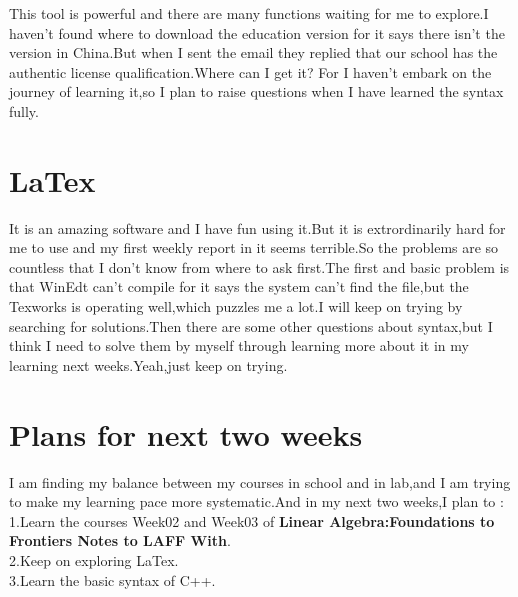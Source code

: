 \documentclass{article}
\begin{document}
This tool is powerful and there are many functions waiting for me to explore.I haven't found where to download the education version for it says there isn't the version in China.But when I sent the email they replied that our school has the authentic license qualification.Where can I get it? For I haven't embark on the journey of learning it,so I plan to raise questions when I have learned the syntax fully.

\section{LaTex}

It is an amazing software and I have fun using it.But it is extrordinarily hard for me to use and my first weekly report in it seems terrible.So the problems are so countless that I don't know from where to ask first.The first and basic problem is that WinEdt can't compile for it says the system can't find the file,but the Texworks is operating well,which puzzles me a lot.I will keep on trying by searching for solutions.Then there are some other questions about syntax,but I think I need to solve them by myself through learning more about it in my learning next weeks.Yeah,just keep on trying.

\section{Plans for next two weeks}
I am finding my balance between my courses in school and in lab,and I am trying to make my learning pace more systematic.And in my next two weeks,I plan to :\\
1.Learn the courses Week02 and Week03 of \textbf{Linear Algebra:Foundations to Frontiers Notes to LAFF With}.\\
2.Keep on exploring LaTex.\\
3.Learn the basic syntax of C++.
\end{document}
